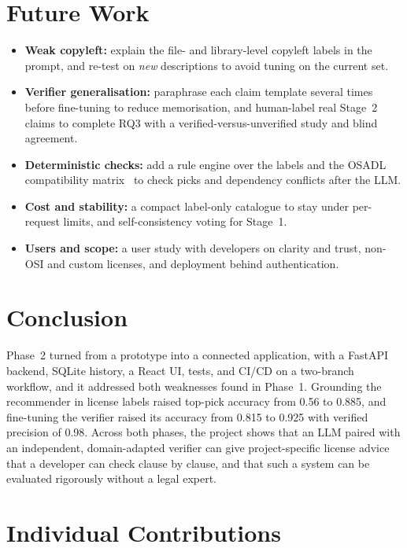 \section{Future Work}
\label{s:future}

\begin{itemize}
    \item \textbf{Weak copyleft:} explain the file- and library-level copyleft labels in the prompt, and re-test on \emph{new} descriptions to avoid tuning on the current set.
    \item \textbf{Verifier generalisation:} paraphrase each claim template several times before fine-tuning to reduce memorisation, and human-label real Stage~2 claims to complete RQ3 with a verified-versus-unverified study and blind agreement.
    \item \textbf{Deterministic checks:} add a rule engine over the labels and the OSADL compatibility matrix~\cite{osadl} to check picks and dependency conflicts after the LLM.
    \item \textbf{Cost and stability:} a compact label-only catalogue to stay under per-request limits, and self-consistency voting for Stage~1.
    \item \textbf{Users and scope:} a user study with developers on clarity and trust, non-OSI and custom licenses, and deployment behind authentication.
\end{itemize}

\section{Conclusion}
\label{s:conclusion}

Phase~2 turned \sys{} from a prototype into a connected application, with a FastAPI backend, SQLite history, a React UI, tests, and CI/CD on a two-branch workflow, and it addressed both weaknesses found in Phase~1. Grounding the recommender in license labels raised top-pick accuracy from 0.56 to 0.885, and fine-tuning the verifier raised its accuracy from 0.815 to 0.925 with verified precision of 0.98. Across both phases, the project shows that an LLM paired with an independent, domain-adapted verifier can give project-specific license advice that a developer can check clause by clause, and that such a system can be evaluated rigorously without a legal expert.

\section*{Individual Contributions}
\\
